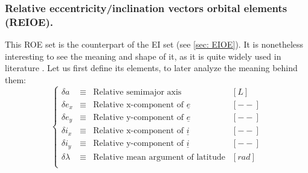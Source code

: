 	\subsubsection{Relative eccentricity/inclination vectors orbital elements (REIOE).} \label{sec:REIOE}
	\indent This ROE set is the counterpart of the EI set (see \ref{sec: EIOE}). It is nonetheless interesting to see the meaning and shape of it, as it is quite widely used in literature \cite{DAmico_montenbruck, Schaub2004, dAmicoDLR}. Let us first define its elements, to later analyze the meaning behind them:
	\begin{equation}
	\left\{ 
	\begin{array}{llll}
	\delta a 	& \equiv & \text{Relative semimajor axis} & [L]\\
	\delta e_x 	& \equiv & \text{Relative x-component of }\underline{e} & [--]\\
	\delta e_y 	& \equiv & \text{Relative y-component of }\underline{e} & [--]\\
	\delta i_x 	& \equiv & \text{Relative x-component of }\underline{i} & [--]\\
	\delta i_y 	& \equiv & \text{Relative y-component of }\underline{i} & [--]\\
	\delta \lambda & \equiv 	& \text{Relative mean argument of latitude} & [rad]\\
	\end{array}
	\right.
	\label{eq: 	def_REIOE}
	\end{equation}
